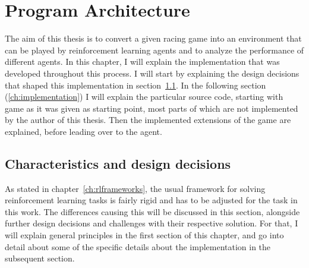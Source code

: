 \chapter{Program Architecture}

\label{ch:program}

\newcommand{\term}[1] {{\spaceskip=.95\fontdimen2\font minus \fontdimen4\font
	\xspaceskip=0pt\relax \large\texttt{#1}}}

\renewcommand{\inlinecode}[1]{\colorbox{red}{\lstinline[basicstyle=\ttfamily\color{black}]{#1}}}


\newcommand{\codefunc}[1]{\colorbox{evenmorelightgray}{\lstinline[basicstyle=\ttfamily\color{black},keywordstyle=\ttfamily]{#1}}}

\newcommand{\codeobj}[1]{\colorbox{evenmorelightgray}{{\spaceskip=.95\fontdimen2\font minus \fontdimen4\font	\xspaceskip=0pt\relax \large\texttt{#1}}}}

\newcommand{\codeother}[1]{\colorbox{evenmorelightgray}{\lstinline[basicstyle=\ttfamily\color{black}]{#1}}}


\newcommand{\filename}[1] {{\spaceskip=.95\fontdimen2\font minus \fontdimen4\font
		\xspaceskip=0pt\relax \large\texttt{#1}}}


The aim of this thesis is to convert a given racing game into an environment that can be played by reinforcement learning agents and to analyze the performance of different agents. In this chapter, I will explain the implementation that was developed throughout this process. I will start by explaining the design decisions that shaped this implementation in section~\ref{ch:projectcharacteristicschap}. In the following section (\ref{ch:implementation}) I will explain the particular source code, starting with game as it was given as starting point, most parts of which are not implemented by the author of this thesis. Then the implemented extensions of the game are explained, before leading over to the agent. 

\section{Characteristics and design decisions}

\label{ch:projectcharacteristicschap}

As stated in chapter~\ref{ch:rlframeworks}, the usual framework for solving reinforcement learning tasks is fairly rigid and has to be adjusted for the task in this work. The differences causing this will be discussed in this section, alongside further design decisions and challenges with their respective solution. For that, I will explain general principles in the first section of this chapter, and go into detail about some of the specific details about the implementation in the subsequent section.

